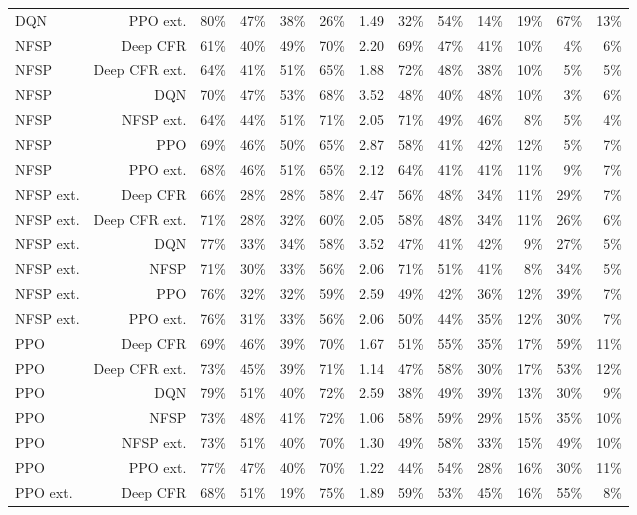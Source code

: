 \begin{tabular}{lrrrrrrrrrrrr}
DQN & PPO ext. & 80\% & 47\% & 38\% & 26\% & 1.49 & 32\% & 54\% & 14\% & 19\% & 67\% & 13\% \\
NFSP & Deep CFR & 61\% & 40\% & 49\% & 70\% & 2.20 & 69\% & 47\% & 41\% & 10\% & 4\% & 6\% \\
NFSP & Deep CFR ext. & 64\% & 41\% & 51\% & 65\% & 1.88 & 72\% & 48\% & 38\% & 10\% & 5\% & 5\% \\
NFSP & DQN & 70\% & 47\% & 53\% & 68\% & 3.52 & 48\% & 40\% & 48\% & 10\% & 3\% & 6\% \\
NFSP & NFSP ext. & 64\% & 44\% & 51\% & 71\% & 2.05 & 71\% & 49\% & 46\% & 8\% & 5\% & 4\% \\
NFSP & PPO & 69\% & 46\% & 50\% & 65\% & 2.87 & 58\% & 41\% & 42\% & 12\% & 5\% & 7\% \\
NFSP & PPO ext. & 68\% & 46\% & 51\% & 65\% & 2.12 & 64\% & 41\% & 41\% & 11\% & 9\% & 7\% \\
NFSP ext. & Deep CFR & 66\% & 28\% & 28\% & 58\% & 2.47 & 56\% & 48\% & 34\% & 11\% & 29\% & 7\% \\
NFSP ext. & Deep CFR ext. & 71\% & 28\% & 32\% & 60\% & 2.05 & 58\% & 48\% & 34\% & 11\% & 26\% & 6\% \\
NFSP ext. & DQN & 77\% & 33\% & 34\% & 58\% & 3.52 & 47\% & 41\% & 42\% & 9\% & 27\% & 5\% \\
NFSP ext. & NFSP & 71\% & 30\% & 33\% & 56\% & 2.06 & 71\% & 51\% & 41\% & 8\% & 34\% & 5\% \\
NFSP ext. & PPO & 76\% & 32\% & 32\% & 59\% & 2.59 & 49\% & 42\% & 36\% & 12\% & 39\% & 7\% \\
NFSP ext. & PPO ext. & 76\% & 31\% & 33\% & 56\% & 2.06 & 50\% & 44\% & 35\% & 12\% & 30\% & 7\% \\
PPO & Deep CFR & 69\% & 46\% & 39\% & 70\% & 1.67 & 51\% & 55\% & 35\% & 17\% & 59\% & 11\% \\
PPO & Deep CFR ext. & 73\% & 45\% & 39\% & 71\% & 1.14 & 47\% & 58\% & 30\% & 17\% & 53\% & 12\% \\
PPO & DQN & 79\% & 51\% & 40\% & 72\% & 2.59 & 38\% & 49\% & 39\% & 13\% & 30\% & 9\% \\
PPO & NFSP & 73\% & 48\% & 41\% & 72\% & 1.06 & 58\% & 59\% & 29\% & 15\% & 35\% & 10\% \\
PPO & NFSP ext. & 73\% & 51\% & 40\% & 70\% & 1.30 & 49\% & 58\% & 33\% & 15\% & 49\% & 10\% \\
PPO & PPO ext. & 77\% & 47\% & 40\% & 70\% & 1.22 & 44\% & 54\% & 28\% & 16\% & 30\% & 11\% \\
PPO ext. & Deep CFR & 68\% & 51\% & 19\% & 75\% & 1.89 & 59\% & 53\% & 45\% & 16\% & 55\% & 8\% \\

\end{tabular}
